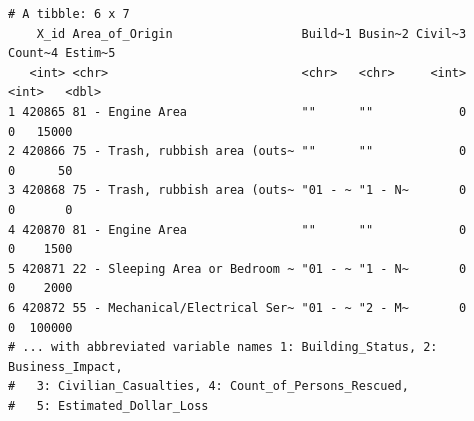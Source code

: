\documentclass[
  oneside]{memoir}
\begin{document}
\begin{verbatim}
# A tibble: 6 x 7
    X_id Area_of_Origin                  Build~1 Busin~2 Civil~3 Count~4 Estim~5
   <int> <chr>                           <chr>   <chr>     <int>   <int>   <dbl>
1 420865 81 - Engine Area                ""      ""            0       0   15000
2 420866 75 - Trash, rubbish area (outs~ ""      ""            0       0      50
3 420868 75 - Trash, rubbish area (outs~ "01 - ~ "1 - N~       0       0       0
4 420870 81 - Engine Area                ""      ""            0       0    1500
5 420871 22 - Sleeping Area or Bedroom ~ "01 - ~ "1 - N~       0       0    2000
6 420872 55 - Mechanical/Electrical Ser~ "01 - ~ "2 - M~       0       0  100000
# ... with abbreviated variable names 1: Building_Status, 2: Business_Impact,
#   3: Civilian_Casualties, 4: Count_of_Persons_Rescued,
#   5: Estimated_Dollar_Loss
\end{verbatim}

\printbibliography

\backmatter
\end{document}
